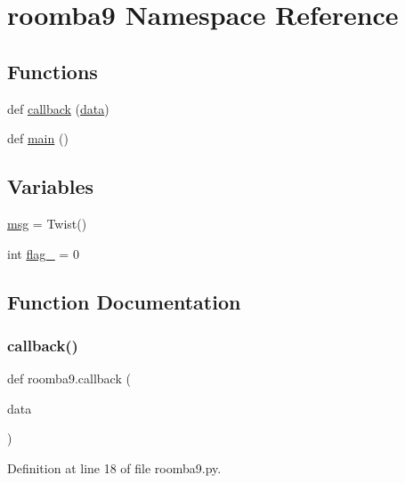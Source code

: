 \hypertarget{namespaceroomba9}{}\section{roomba9 Namespace Reference}
\label{namespaceroomba9}
\subsection*{Functions}
\begin{DoxyCompactItemize}
\item 
def \mbox{\hyperlink{namespaceroomba9_ae4173fb7b4acd9585ab65649ae123433}{callback}} (\mbox{\hyperlink{structdata}{data}})
\item 
def \mbox{\hyperlink{namespaceroomba9_af24f5725cffa7d7611a4cad3775349f7}{main}} ()
\end{DoxyCompactItemize}
\subsection*{Variables}
\begin{DoxyCompactItemize}
\item 
\mbox{\hyperlink{namespaceroomba9_a2cdab353ac92c820d7193a9970298d4a}{msg}} = Twist()
\item 
int \mbox{\hyperlink{namespaceroomba9_a743412de1a5ddf3fac078d878ede1113}{flag\+\_}} = 0
\end{DoxyCompactItemize}


\subsection{Function Documentation}
\mbox{\label{namespaceroomba9_ae4173fb7b4acd9585ab65649ae123433}} 
\subsubsection{\texorpdfstring{callback()}{callback()}}
{\footnotesize\ttfamily def roomba9.\+callback (\begin{DoxyParamCaption}\item[{}]{data }\end{DoxyParamCaption})}



Definition at line 18 of file roomba9.\+py.

\mbox{\label{namespaceroomba9_af24f5725cffa7d7611a4cad3775349f7}} 
